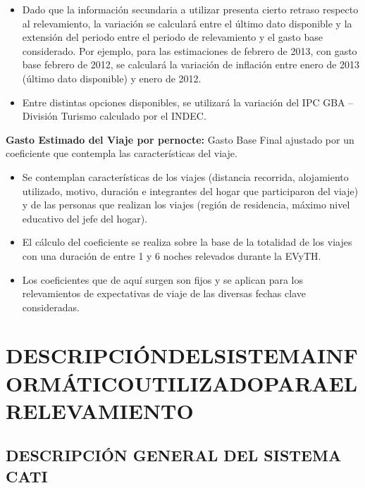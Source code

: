 \documentclass[
  openany]{book}
\begin{document}
\begin{itemize}
\item
  Dado que la información secundaria a utilizar presenta cierto retraso respecto al relevamiento, la variación se calculará entre el último dato disponible y la extensión del periodo entre el periodo de relevamiento y el gasto base considerado. Por ejemplo, para las estimaciones de febrero de 2013, con gasto base febrero de 2012, se calculará la variación de inflación entre enero de 2013 (último dato disponible) y enero de 2012.
\item
  Entre distintas opciones disponibles, se utilizará la variación del IPC GBA -- División Turismo calculado por el INDEC.
\end{itemize}

\textbf{Gasto Estimado del Viaje por pernocte:} Gasto Base Final ajustado por un coeficiente que contempla las características del viaje.

\begin{itemize}
\item
  Se contemplan características de los viajes (distancia recorrida, alojamiento utilizado, motivo, duración e integrantes del hogar que participaron del viaje) y de las personas que realizan los viajes (región de residencia, máximo nivel educativo del jefe del hogar).
\item
  El cálculo del coeficiente se realiza sobre la base de la totalidad de los viajes con una duración de entre 1 y 6 noches relevados durante la EVyTH.
\item
  Los coeficientes que de aquí surgen son fijos y se aplican para los relevamientos de expectativas de viaje de las diversas fechas clave consideradas.
\end{itemize}

\hypertarget{descripciondelsistemainformaticoutilizadoparaelrelevamiento}{%
\section{\texorpdfstring{\textbf{DESCRIPCIÓNDELSISTEMAINFORMÁTICOUTILIZADOPARAELRELEVAMIENTO}}{DESCRIPCIÓNDELSISTEMAINFORMÁTICOUTILIZADOPARAELRELEVAMIENTO}}\label{descripciondelsistemainformaticoutilizadoparaelrelevamiento}}

\hypertarget{descripciuxf3n-general-del-sistema-cati}{%
\subsection{\texorpdfstring{\textbf{DESCRIPCIÓN GENERAL DEL SISTEMA CATI}}{DESCRIPCIÓN GENERAL DEL SISTEMA CATI}}\label{descripciuxf3n-general-del-sistema-cati}}
\end{document}
